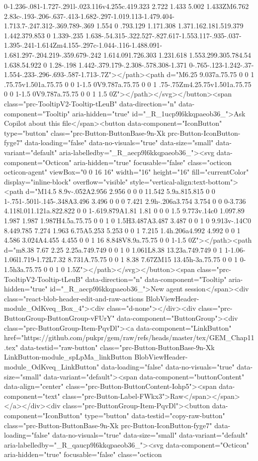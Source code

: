 0-1.236-.081-1.727-.291l-.023.116v4.255c.419.323 2.722 1.433 5.002 1.433ZM6.762 2.83c-.193-.206-.637-.413-1.682-.297-1.019.113-1.479.404-1.713.7-.247.312-.369.789-.369 1.554 0 .793.129 1.171.308 1.371.162.181.519.379 1.442.379.853 0 1.339-.235 1.638-.54.315-.322.527-.827.617-1.553.117-.935-.037-1.395-.241-1.614Zm4.155-.297c-1.044-.116-1.488.091-1.681.297-.204.219-.359.679-.242 1.614.091.726.303 1.231.618 1.553.299.305.784.54 1.638.54.922 0 1.28-.198 1.442-.379.179-.2.308-.578.308-1.371 0-.765-.123-1.242-.37-1.554-.233-.296-.693-.587-1.713-.7Z"></path><path d="M6.25 9.037a.75.75 0 0 1 .75.75v1.501a.75.75 0 0 1-1.5 0V9.787a.75.75 0 0 1 .75-.75Zm4.25.75v1.501a.75.75 0 0 1-1.5 0V9.787a.75.75 0 0 1 1.5 0Z"></path></svg></button><span class="prc-TooltipV2-Tooltip-tLeuB" data-direction="n" data-component="Tooltip" aria-hidden="true" id="_R_1ucp9l6kkqpaeob36_">Ask Copilot about this file</span><button data-component="IconButton" type="button" class="prc-Button-ButtonBase-9n-Xk prc-Button-IconButton-fyge7" data-loading="false" data-no-visuals="true" data-size="small" data-variant="default" aria-labelledby="_R_aecp9l6kkqpaeob36_"><svg data-component="Octicon" aria-hidden="true" focusable="false" class="octicon octicon-agent" viewBox="0 0 16 16" width="16" height="16" fill="currentColor" display="inline-block" overflow="visible" style="vertical-align:text-bottom"><path d="M14.5 8.9v-.052A2.956 2.956 0 0 0 11.542 5.9a.815.815 0 0 1-.751-.501l-.145-.348A3.496 3.496 0 0 0 7.421 2.9h-.206a3.754 3.754 0 0 0-3.736 4.118l.011.121a.822.822 0 0 1-.619.879A1.81 1.81 0 0 0 1.5 9.773v.14c0 1.097.89 1.987 1.987 1.987H4.5a.75.75 0 0 1 0 1.5H3.487A3.487 3.487 0 0 1 0 9.913v-.14C0 8.449.785 7.274 1.963 6.75A5.253 5.253 0 0 1 7.215 1.4h.206a4.992 4.992 0 0 1 4.586 3.024A4.455 4.455 0 0 1 16 8.848V8.9a.75.75 0 0 1-1.5 0Z"></path><path d="m8.38 7.67 2.25 2.25a.749.749 0 0 1 0 1.061L8.38 13.23a.749.749 0 1 1-1.06-1.06l1.719-1.72L7.32 8.731A.75.75 0 0 1 8.38 7.67ZM15 13.45h-3a.75.75 0 0 1 0-1.5h3a.75.75 0 0 1 0 1.5Z"></path></svg></button><span class="prc-TooltipV2-Tooltip-tLeuB" data-direction="n" data-component="Tooltip" aria-hidden="true" id="_R_aecp9l6kkqpaeob36_">New agent session</span><div class="react-blob-header-edit-and-raw-actions BlobViewHeader-module_OdKveq_Box_4"><div class="d-none"></div><div class="prc-ButtonGroup-ButtonGroup-vFUrY" data-component="ButtonGroup"><div class="prc-ButtonGroup-Item-PqvDl"><a data-component="LinkButton" href="https://github.com/pukpr/gem/raw/refs/heads/master/tex/GEM_Chap11.tex" data-testid="raw-button" class="prc-Button-ButtonBase-9n-Xk LinkButton-module_spLpMa_linkButton BlobViewHeader-module_OdKveq_LinkButton" data-loading="false" data-no-visuals="true" data-size="small" data-variant="default"><span data-component="buttonContent" data-align="center" class="prc-Button-ButtonContent-Iohp5"><span data-component="text" class="prc-Button-Label-FWkx3">Raw</span></span></a></div><div class="prc-ButtonGroup-Item-PqvDl"><button data-component="IconButton" type="button" data-testid="copy-raw-button" class="prc-Button-ButtonBase-9n-Xk prc-Button-IconButton-fyge7" data-loading="false" data-no-visuals="true" data-size="small" data-variant="default" aria-labelledby="_R_qaucp9l6kkqpaeob36_"><svg data-component="Octicon" aria-hidden="true" focusable="false" class="octicon 